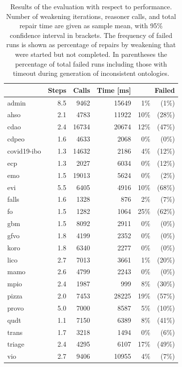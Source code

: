 \begin{table}[ht]
  \scriptsize
  \centering
  \begin{tabular}{|l|rrrr@{ }r|}
    \cline{2-6}
    \multicolumn{1}{l|}{} & Steps & Calls & Time [ms] & \multicolumn{2}{r|}{Failed} \\
    \hline
    admin & 8.5 & 9462 & 15649 & 1\% & (1\%) \\
    ahso & 2.1 & 4783 & 11922 & 10\% & (28\%) \\
    cdao & 2.4 & 16734 & 20674 & 12\% & (47\%) \\
    cdpeo & 1.6 & 4633 & 2068 & 0\% & (0\%) \\
    covid19-ibo & 1.3 & 14632 & 2186 & 4\% & (12\%) \\
    ecp & 1.3 & 2027 & 6034 & 0\% & (12\%) \\
    emo & 1.5 & 19013 & 5624 & 0\% & (2\%) \\
    evi & 5.5 & 6405 & 4916 & 10\% & (68\%) \\
    falls & 1.6 & 1328 & 876 & 2\% & (7\%) \\
    fo & 1.5 & 1282 & 1064 & 25\% & (62\%) \\
    gbm & 1.5 & 8092 & 2911 & 0\% & (0\%) \\
    gfvo & 1.8 & 4199 & 2352 & 0\% & (0\%) \\
    koro & 1.8 & 6340 & 2277 & 0\% & (0\%) \\
    lico & 2.7 & 7013 & 3661 & 1\% & (20\%) \\
    mamo & 2.6 & 4799 & 2243 & 0\% & (0\%) \\
    mpio & 2.4 & 1987 & 999 & 8\% & (30\%) \\
    pizza & 2.0 & 7453 & 28225 & 19\% & (57\%) \\
    provo & 5.0 & 7000 & 8587 & 5\% & (10\%) \\
    qudt & 1.1 & 7150 & 6389 & 8\% & (41\%) \\
    trans & 1.7 & 3218 & 1494 & 0\% & (6\%) \\
    triage & 2.4 & 4295 & 6107 & 17\% & (49\%) \\
    vio & 2.7 & 9406 & 10955 & 4\% & (7\%) \\
    \hline
  \end{tabular}
  \caption{Results of the evaluation with respect to performance. Number of weakening iterations, reasoner calls, and total repair time are given as sample mean, with 95\% confidence interval in brackets. The frequency of failed runs is shown as percentage of repairs by weakening that were started but not completed. In parentheses the percentage of total failed runs including those with timeout during generation of inconsistent ontologies.}
  \label{table:results-perf}
\end{table}

